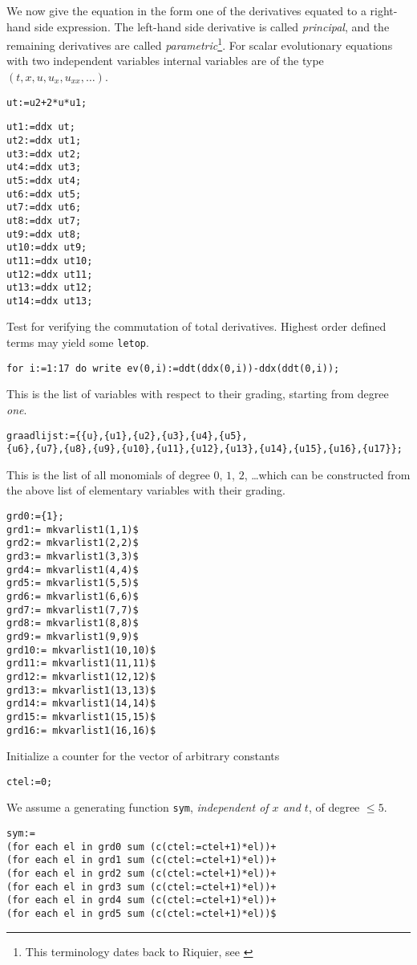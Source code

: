 \documentclass[12pt]{amsart}
\theoremstyle{definition}
\begin{document}
We now give the equation in the form one of the derivatives equated to a
right-hand side expression. The left-hand side derivative is called
\emph{principal}, and the remaining derivatives are called
\emph{parametric}\footnote{This terminology dates back to Riquier, see
  \cite{Mar}}.  For scalar
evolutionary equations with two independent variables internal variables are of
the type $(t,x,u,u_x,u_{xx},\ldots)$.
\begin{verbatim}
ut:=u2+2*u*u1;
\end{verbatim}

\begin{verbatim}
ut1:=ddx ut;
ut2:=ddx ut1;
ut3:=ddx ut2;
ut4:=ddx ut3;
ut5:=ddx ut4;
ut6:=ddx ut5;
ut7:=ddx ut6;
ut8:=ddx ut7;
ut9:=ddx ut8;
ut10:=ddx ut9;
ut11:=ddx ut10;
ut12:=ddx ut11;
ut13:=ddx ut12;
ut14:=ddx ut13;
\end{verbatim}

Test for verifying the commutation of total derivatives.
Highest order defined terms may yield some \texttt{letop}.
\begin{verbatim}
for i:=1:17 do write ev(0,i):=ddt(ddx(0,i))-ddx(ddt(0,i));
\end{verbatim}

This is the list of variables with respect to their grading,
starting from degree \emph{one}.
\begin{verbatim}
graadlijst:={{u},{u1},{u2},{u3},{u4},{u5},
{u6},{u7},{u8},{u9},{u10},{u11},{u12},{u13},{u14},{u15},{u16},{u17}};
\end{verbatim}

This is the list of all monomials of degree $0$, $1$, $2$, \dots which can be
constructed from the above list of elementary variables with their grading.
\begin{verbatim}
grd0:={1};
grd1:= mkvarlist1(1,1)$
grd2:= mkvarlist1(2,2)$
grd3:= mkvarlist1(3,3)$
grd4:= mkvarlist1(4,4)$
grd5:= mkvarlist1(5,5)$
grd6:= mkvarlist1(6,6)$
grd7:= mkvarlist1(7,7)$
grd8:= mkvarlist1(8,8)$
grd9:= mkvarlist1(9,9)$
grd10:= mkvarlist1(10,10)$
grd11:= mkvarlist1(11,11)$
grd12:= mkvarlist1(12,12)$
grd13:= mkvarlist1(13,13)$
grd14:= mkvarlist1(14,14)$
grd15:= mkvarlist1(15,15)$
grd16:= mkvarlist1(16,16)$
\end{verbatim}

Initialize a counter for the vector of arbitrary constants
\begin{verbatim}
ctel:=0;
\end{verbatim}

We assume a generating function \texttt{sym}, \emph{independent of $x$ and
  $t$}, of degree $\leq 5$.
\begin{verbatim}
sym:=
(for each el in grd0 sum (c(ctel:=ctel+1)*el))+
(for each el in grd1 sum (c(ctel:=ctel+1)*el))+
(for each el in grd2 sum (c(ctel:=ctel+1)*el))+
(for each el in grd3 sum (c(ctel:=ctel+1)*el))+
(for each el in grd4 sum (c(ctel:=ctel+1)*el))+
(for each el in grd5 sum (c(ctel:=ctel+1)*el))$
\end{verbatim}
\end{document}

